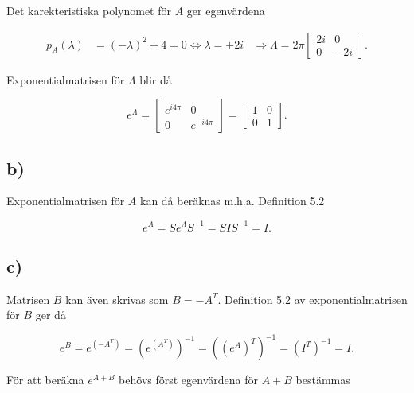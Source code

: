 \documentclass[a4paper]{article}
\newcommand{\mat}[1]{\bm{\mathit{#1}}}
\begin{document}
Det karekteristiska polynomet för $\mat{A}$ ger egenvärdena

\begin{align*}
  p_A(\lambda) &= (-\lambda)^2 + 4 = 0 \iff \lambda = \pm 2i
                 &\Rightarrow \mat{\Lambda} = 2\pi\begin{bmatrix}2i & 0\\0 & -2i\end{bmatrix}.
\end{align*}

\noindent Exponentialmatrisen för $\mat{\Lambda}$ blir då

\begin{equation*}
  e^{\mat{\Lambda}} = \begin{bmatrix}e^{i4\pi} & 0\\0 & e^{-i4\pi}\end{bmatrix} = \begin{bmatrix}1 & 0\\0 & 1\end{bmatrix}.
\end{equation*}

\subsection*{b)}

Exponentialmatrisen för $\mat{A}$ kan då beräknas m.h.a. Definition 5.2

\begin{equation*}
  e^{\mat{A}} = \mat{S}e^{\mat{\Lambda}}\mat{S}^{-1} = \mat{S}\mat{I}\mat{S}^{-1} = \mat{I}.
\end{equation*}

\subsection*{c)}

Matrisen $\mat{B}$ kan även skrivas som $\mat{B} = -\mat{A}^T$. Definition 5.2
av exponentialmatrisen för $\mat{B}$ ger då

\begin{equation*}
  e^{\mat{B}} = e^{\left( -\mat{A}^T \right)} = \left( e^{\left( \mat{A}^T \right)} \right)^{-1} = \left( \left( e^{\mat{A}} \right)^T \right)^{-1} = \left( \mat{I}^T \right)^{-1} = \mat{I}.
\end{equation*}

\noindent För att beräkna $e^{\mat{A} + \mat{B}}$ behövs först egenvärdena för
$\mat{A} + \mat{B}$ bestämmas
\end{document}
